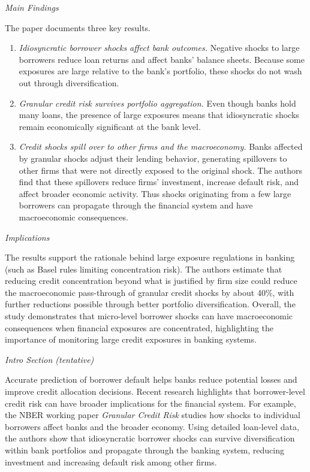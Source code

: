 \documentclass[letterpaper]{article}
\begin{document}
	\medskip
	
	\textit{Main Findings}
	
	The paper documents three key results.
	\begin{enumerate}
		\item \textit{Idiosyncratic borrower shocks affect bank outcomes.} Negative shocks to large borrowers reduce loan returns and affect banks' balance sheets. Because some exposures are large relative to the bank's portfolio, these shocks do not wash out through diversification.
		\item \textit{Granular credit risk survives portfolio aggregation.} Even though banks hold many loans, the presence of large exposures means that idiosyncratic shocks remain economically significant at the bank level.
		\item \textit{Credit shocks spill over to other firms and the macroeconomy.} Banks affected by granular shocks adjust their lending behavior, generating spillovers to other firms that were not directly exposed to the original shock. The authors find that these spillovers reduce firms' investment, increase default risk, and affect broader economic activity. Thus shocks originating from a few large borrowers can propagate through the financial system and have macroeconomic consequences.
	\end{enumerate}
	
	\medskip
	
	\textit{Implications}
	
	The results support the rationale behind large exposure regulations in banking (such as Basel rules limiting concentration risk). The authors estimate that reducing credit concentration beyond what is justified by firm size could reduce the macroeconomic pass-through of granular credit shocks by about 40\%, with further reductions possible through better portfolio diversification. Overall, the study demonstrates that micro-level borrower shocks can have macroeconomic consequences when financial exposures are concentrated, highlighting the importance of monitoring large credit exposures in banking systems.
	
	\medskip
	
	\textit{Intro Section (tentative)}
	
	Accurate prediction of borrower default helps banks reduce potential losses and improve credit allocation decisions. Recent research highlights that borrower-level credit risk can have broader implications for the financial system. For example, the NBER working paper \textit{Granular Credit Risk} studies how shocks to individual borrowers affect banks and the broader economy. Using detailed loan-level data, the authors show that idiosyncratic borrower shocks can survive diversification within bank portfolios and propagate through the banking system, reducing investment and increasing default risk among other firms.
	
\end{document}
